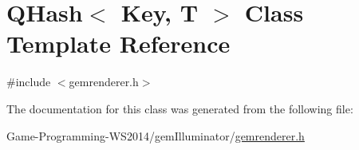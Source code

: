 \hypertarget{class_q_hash}{}\section{Q\+Hash$<$ Key, T $>$ Class Template Reference}
\label{class_q_hash}


{\ttfamily \#include $<$gemrenderer.\+h$>$}



The documentation for this class was generated from the following file\+:\begin{DoxyCompactItemize}
\item 
Game-\/\+Programming-\/\+W\+S2014/gem\+Illuminator/\hyperlink{gemrenderer_8h}{gemrenderer.\+h}\end{DoxyCompactItemize}
